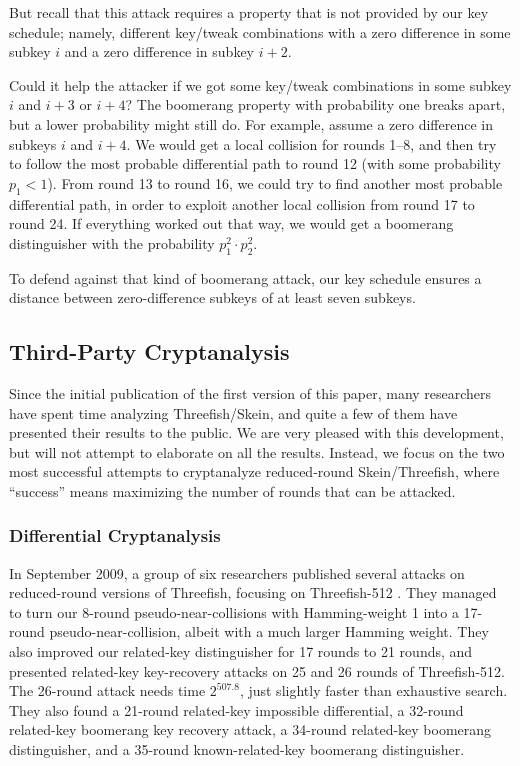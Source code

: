 \documentclass[11pt,twoside]{article}
\begin{document}
But recall that this attack requires a property that is not provided by our key schedule; namely, different key/tweak combinations with a zero difference in some subkey $i$ and a zero difference in subkey $i+2$.

Could it help the attacker if we got some key/tweak combinations in some subkey $i$ and $i+3$ or $i+4$? The boomerang property with probability one breaks apart, but a lower probability might still do. For example, assume a zero difference in subkeys $i$ and $i+4$. We would get a local collision for rounds 1--8, and then try to follow the most probable differential path to round 12 (with some probability $p_1 < 1$). From round 13 to round 16, we could try to find another most probable differential path, in order to exploit another local collision from round 17 to round 24. If everything worked out that way, we would get a boomerang distinguisher with the probability $p_1^2 \cdot p_2^2$.

To defend against that kind of boomerang attack, our key schedule ensures a distance between zero-difference subkeys of at least seven subkeys.

\subsection{Third-Party Cryptanalysis}
\label{sec:third-party-analysis}

Since the initial publication of the first version of this paper, many
researchers have spent time analyzing Threefish/Skein, and quite a few of
them have presented their results to the public. We are very pleased with this
development, but will not attempt to elaborate on all the results. 
Instead, we focus on the two most successful attempts to cryptanalyze
reduced-round Skein/Threefish, where ``success'' means maximizing the number
of rounds that can be attacked.

\subsubsection{Differential Cryptanalysis}


In September 2009, a group of six researchers published several attacks on reduced-round versions of Threefish, focusing on Threefish-512 \cite{ACMOPV09}. They managed to turn our 8-round pseudo-near-collisions with Hamming-weight 1 into a 17-round pseudo-near-collision, albeit with a much larger Hamming weight.  They also improved our related-key distinguisher for 17 rounds to 21 rounds, and presented related-key key-recovery attacks on 25 and 26 rounds of Threefish-512. The 26-round attack needs time $2^{507.8}$, just slightly faster than exhaustive search.  They also found a 21-round related-key impossible differential, a 32-round related-key boomerang key recovery attack, a 34-round related-key boomerang distinguisher, and a 35-round known-related-key boomerang distinguisher.
\end{document}

